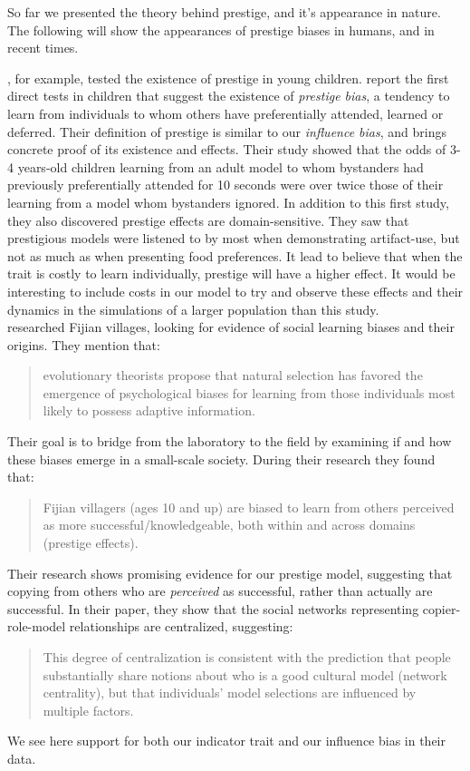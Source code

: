 \documentclass[12pt]{extarticle}
\begin{document}
So far we presented the theory behind prestige, and it's appearance in nature. The following will show the appearances of prestige biases in humans, and in recent times.

\citet{prestige_cultural_learning}, for example, tested the existence of prestige in young children. \citet{prestige_cultural_learning} report the first direct tests in children that suggest the existence of \textit{prestige bias}, a tendency to learn from individuals to whom others have preferentially attended, learned or deferred.
Their definition of prestige is similar to our \textit{influence bias}, and brings concrete proof of its existence and effects. Their study showed that the odds of 3-4 years-old children learning from an adult model to whom bystanders had previously preferentially attended for 10 seconds were over twice those of their learning from a model whom bystanders ignored.
In addition to this first study, they also discovered prestige effects are domain-sensitive. They saw that prestigious models were listened to by most when demonstrating artifact-use, but not as much as when presenting food preferences. It lead \citet{prestige_cultural_learning} to believe that when the trait is costly to learn individually, prestige will have a higher effect. It would be interesting to include costs in our model to try and observe these effects and their dynamics in the simulations of a larger population than this study.\\

\citet{fijian_social_bias} researched Fijian villages, looking for evidence of social learning biases and their origins. They mention that:
\begin{quote}
evolutionary theorists propose that natural selection has favored the emergence of psychological biases for learning from those individuals most likely to possess adaptive information.
\end{quote}
Their goal is to bridge from the laboratory to the field by examining if and how these biases emerge in a small-scale society.
During their research they found that:
\begin{quote}
Fijian villagers (ages 10 and up) are biased to learn from others perceived as more successful/knowledgeable, both within and across domains (prestige effects).
\end{quote}
Their research shows promising evidence for our prestige model, suggesting that copying from others who are \textit{perceived} as successful, rather than actually are successful. In their paper, they show that the social networks representing copier-role-model relationships are centralized, suggesting:
\begin{quote}
This degree of centralization is consistent with the prediction that people substantially share notions about who is a good cultural model (network centrality), but that individuals’ model selections are influenced by multiple factors.
\end{quote}
We see here support for both our indicator trait and our influence bias in their data.\\
\end{document}
